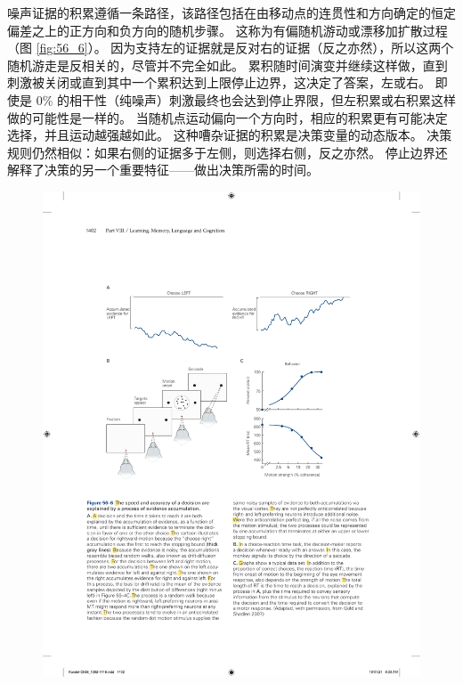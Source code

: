 噪声证据的积累遵循一条路径，该路径包括在由移动点的连贯性和方向确定的恒定偏差之上的正方向和负方向的随机步骤。 这称为有偏随机游动或漂移加扩散过程（图 \ref{fig:56_6}）。 因为支持左的证据就是反对右的证据（反之亦然），所以这两个随机游走是反相关的，尽管并不完全如此。 累积随时间演变并继续这样做，直到刺激被关闭或直到其中一个累积达到上限停止边界，这决定了答案，左或右。 即使是 0\% 的相干性（纯噪声）刺激最终也会达到停止界限，但左积累或右积累这样做的可能性是一样的。 当随机点运动偏向一个方向时，相应的积累更有可能决定选择，并且运动越强越如此。 这种嘈杂证据的积累是决策变量的动态版本。 决策规则仍然相似：如果右侧的证据多于左侧，则选择右侧，反之亦然。 停止边界还解释了决策的另一个重要特征——做出决策所需的时间。

\begin{figure}[htbp]
	\centering
	\includegraphics[width=0.8\linewidth]{chap56/fig_56_6}

\end{figure}
